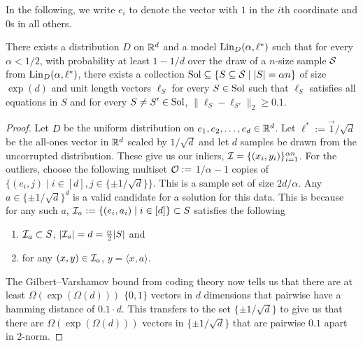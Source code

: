 In the following, we write $e_i$ to denote the vector with $1$ in the $i$th coordinate and $0$s in all others. 
\begin{proposition}
There exists a distribution $D$ on $\mathbb R^d$ and a model $\mathrm{Lin}_D(\alpha,\ell^*)$ such that for every $\alpha <1/2$, with probability at least $1-1/d$ over the draw of a $n$-size sample $\mathcal S$ from $\mathrm{Lin}_D(\alpha,\ell^*)$, there exists a collection $\mathrm{Sol} \subseteq \left\{S \subseteq \mathcal S \mid |S| = \alpha n\right\}$ of size $\exp(d)$ and unit length vectors $\ell_S$ for every $S \in \mathrm{Sol}$ such that $\ell_S$ satisfies all equations in $S$ and for every $S \neq S' \in \mathrm{Sol}$, $\|\ell_S - \ell_{S'}\|_2 \geq 0.1 $. %

\label{prop:brute-force-doesn't-work}
\end{proposition}
\begin{proof}

Let $D$ be the uniform distribution on $e_1, e_2, \ldots, e_d \in \mathbb R^d$. Let $\ell^* := \vec{1}/\sqrt{d}$ be the all-ones vector in $\mathbb R^d$ scaled by $1/\sqrt{d}$ and let $d$ samples be drawn from the uncorrupted distribution. These give us our inliers, $\mathcal I = \{ (x_i, y_i) \}_{i=1}^{\alpha n}$. For the outliers, choose the following multiset $\mathcal O :=$ $1/\alpha-1$ copies of $\{ (e_i, j) \mid i \in [d], j \in \{\pm 1/\sqrt{d}\}\}$. This is a sample set of size $2d/\alpha$. Any $a \in \{\pm1/\sqrt{d}\}^d$ is a valid candidate for a solution for this data. This is because for any such $a$, $\mathcal I_a := \{ (e_i, a_i) \mid i \in [d] \} \subset S$ satisfies the following
\begin{enumerate}
    \item $\mathcal I_a \subset S$, $|\mathcal I_a| = d = \frac{\alpha}{2} |S|$ and 
    \item for any $(x, y) \in \mathcal I_a$, $y = \langle x, a \rangle$. 
\end{enumerate}
The Gilbert–Varshamov bound from coding theory now tells us that there are at least $\Omega(\exp(\Omega(d)))$ $\{0, 1\}$ vectors in $d$ dimensions that pairwise have a hamming distance of $0.1 \cdot d$. This transfers to the set $\{ \pm 1 /\sqrt{d} \}$ to give us that there are $\Omega(\exp(\Omega(d)))$ vectors in $\{ \pm 1 /\sqrt{d} \}$ that are pairwise $0.1$ apart in $2$-norm. 

\end{proof}

